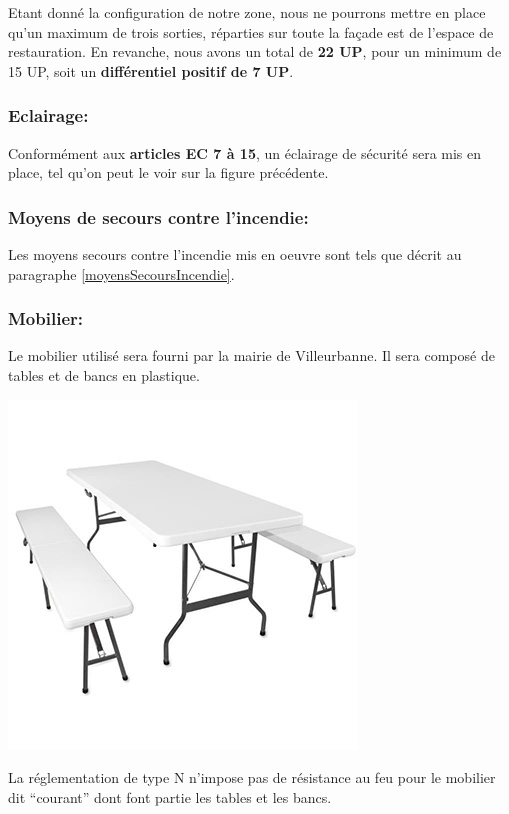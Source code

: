 \documentclass[hidelinks, paper=a4, fontsize=13pt]{report}
\begin{document}
Etant donné la configuration de notre zone, nous ne pourrons mettre en place qu'un maximum de trois sorties, réparties sur toute la façade est de l'espace de restauration. En revanche, nous avons un total de \textbf{22 UP}, pour un minimum de 15 UP, soit un \textbf{différentiel positif de 7 UP}. 

\subsubsection{Eclairage:}

Conformément aux \textbf{articles EC 7 à 15}, un éclairage de sécurité sera mis en place, tel qu'on peut le voir sur la figure précédente.

\subsubsection{Moyens de secours contre l'incendie:}

Les moyens secours contre l'incendie mis en oeuvre sont tels que décrit au paragraphe \ref{moyensSecoursIncendie}.

\subsubsection{Mobilier:}
Le mobilier utilisé sera fourni par la mairie de Villeurbanne. Il sera composé de tables et de bancs en plastique. 
\begin{center}
	\includegraphics[scale=1]{Annexes/Images/tables}
\end{center}
La réglementation de type N n’impose pas de résistance au feu pour le mobilier dit “courant” dont font partie les tables et les bancs. \\
\end{document}
